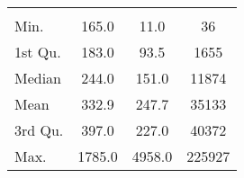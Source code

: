 \begin{tabular}{lS[table-format=5.1]S[table-format=5.1]S[table-format=5.1]}
&  &  &  \\
 Min.    & 165.0 & 11.0 & 36 \\
 1st Qu. & 183.0 & 93.5 & 1655 \\
 Median  & 244.0 & 151.0 & 11874 \\
 Mean    & 332.9 & 247.7 & 35133 \\
 3rd Qu. & 397.0 & 227.0 & 40372 \\
 Max.    & 1785.0 & 4958.0 & 225927 \\
\end{tabular}
